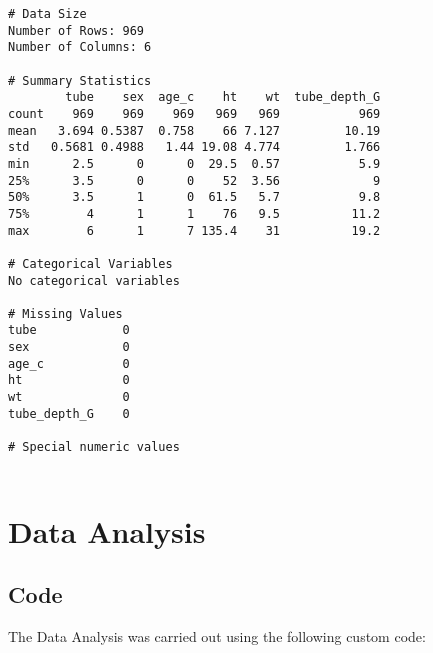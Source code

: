 \documentclass[11pt]{article}
\begin{document}
\begin{Verbatim}[tabsize=4]
# Data Size
Number of Rows: 969
Number of Columns: 6

# Summary Statistics
        tube    sex  age_c    ht    wt  tube_depth_G
count    969    969    969   969   969           969
mean   3.694 0.5387  0.758    66 7.127         10.19
std   0.5681 0.4988   1.44 19.08 4.774         1.766
min      2.5      0      0  29.5  0.57           5.9
25%      3.5      0      0    52  3.56             9
50%      3.5      1      0  61.5   5.7           9.8
75%        4      1      1    76   9.5          11.2
max        6      1      7 135.4    31          19.2

# Categorical Variables
No categorical variables

# Missing Values
tube            0
sex             0
age_c           0
ht              0
wt              0
tube_depth_G    0

# Special numeric values


\end{Verbatim}

\section{Data Analysis}
\subsection{{Code}}
The Data Analysis was carried out using the following custom code:
\end{document}
